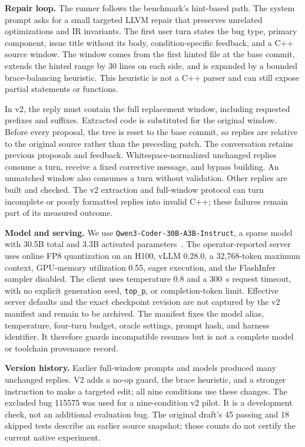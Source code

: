 \documentclass[conference]{IEEEtran}
\begin{document}
\textbf{Repair loop.} The runner follows the benchmark's hint-based path. The system prompt asks for a small targeted LLVM repair that preserves unrelated optimizations and IR invariants. The first user turn states the bug type, primary component, issue title without its body, condition-specific feedback, and a C++ source window. The window comes from the first hinted file at the base commit, extends the hinted range by 30 lines on each side, and is expanded by a bounded brace-balancing heuristic. This heuristic is not a C++ parser and can still expose partial statements or functions.

In v2, the reply must contain the full replacement window, including requested prefixes and suffixes. Extracted code is substituted for the original window. Before every proposal, the tree is reset to the base commit, so replies are relative to the original source rather than the preceding patch. The conversation retains previous proposals and feedback. Whitespace-normalized unchanged replies consume a turn, receive a fixed corrective message, and bypass building. An unmatched window also consumes a turn without validation. Other replies are built and checked. The v2 extraction and full-window protocol can turn incomplete or poorly formatted replies into invalid C++; these failures remain part of its measured outcome.

\textbf{Model and serving.} We use \texttt{Qwen3-Coder-30B-A3B-Instruct}, a sparse model with 30.5B total and 3.3B activated parameters~\cite{qwen3coder30b}. The operator-reported server uses online FP8 quantization on an H100, vLLM 0.28.0, a 32{,}768-token maximum context, GPU-memory utilization 0.55, eager execution, and the FlashInfer sampler disabled. The client uses temperature 0.8 and a 300~s request timeout, with no explicit generation seed, \texttt{top\_p}, or completion-token limit. Effective server defaults and the exact checkpoint revision are not captured by the v2 manifest and remain to be archived. The manifest fixes the model alias, temperature, four-turn budget, oracle settings, prompt hash, and harness identifier. It therefore guards incompatible resumes but is not a complete model or toolchain provenance record.

\textbf{Version history.} Earlier full-window prompts and models produced many unchanged replies. V2 adds a no-op guard, the brace heuristic, and a stronger instruction to make a targeted edit; all nine conditions use these changes. The excluded bug 115575 was used for a nine-condition v2 pilot. It is a development check, not an additional evaluation bug. The original draft's 45 passing and 18 skipped tests describe an earlier source snapshot; those counts do not certify the current native experiment.
\end{document}
